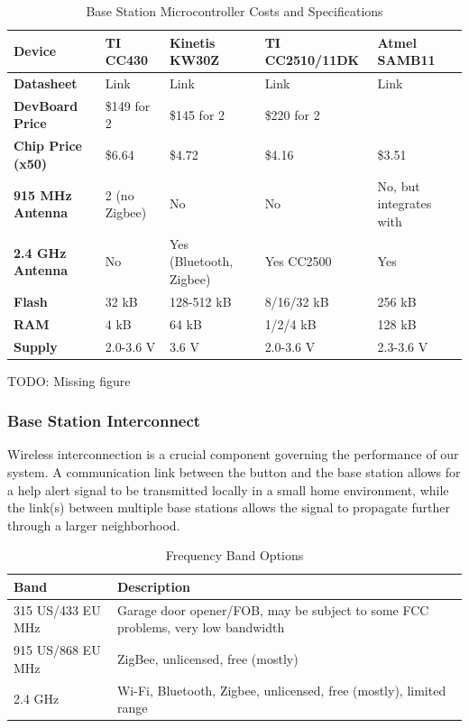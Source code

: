 \documentclass[journal,compsoc]{IEEEtran}
\begin{document}
\begin{table}[t]
  \centering
  \begin{tabular}{>{\bfseries}l|l l l l}
    Device & TI CC430 & Kinetis KW30Z & TI CC2510/11DK & Atmel SAMB11 \\
    \hline
    Datasheet & Link & Link & Link & Link \\
    DevBoard Price & \$149 for 2 & \$145 for 2 & \$220 for 2 & \\
    Chip Price (x50) & \$6.64 & \$4.72 & \$4.16 & \$3.51 \\
    915 MHz Antenna & 2 (no Zigbee) & No & No & No, but integrates with \\
    2.4 GHz Antenna & No & Yes (Bluetooth, Zigbee) & Yes CC2500 & Yes \\
    Flash & 32 kB & 128-512 kB & 8/16/32 kB & 256 kB \\
    RAM & 4 kB & 64 kB & 1/2/4 kB & 128 kB \\
    Supply & 2.0-3.6 V & 3.6 V & 2.0-3.6 V & 2.3-3.6 V
  \end{tabular}
  \caption{Base Station Microcontroller Costs and Specifications}
\end{table}

TODO: Missing figure

\subsubsection{Base Station Interconnect}

Wireless interconnection is a crucial component governing the performance of our system.  A communication link between the button and the base station allows for a help alert signal to be transmitted locally in a small home environment, while the link(s) between multiple base stations allows the signal to propagate further through a larger neighborhood.

\begin{table}[t]
  \centering
  \begin{tabular}{l|l}
    Band & Description \\
    \hline
    315 US/433 EU MHz & Garage door opener/FOB, may be subject to some FCC problems, very low bandwidth \\
    915 US/868 EU MHz & ZigBee, unlicensed, free (mostly) \\
    2.4 GHz & Wi-Fi, Bluetooth, Zigbee, unlicensed, free (mostly), limited range
  \end{tabular}
  \caption{Frequency Band Options}
\end{table}
\end{document}
